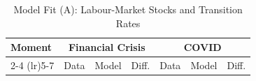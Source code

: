 \begin{table}[htbp]
  \centering
  \caption{Model Fit (A): Labour-Market Stocks and Transition Rates}
  \label{tab:model_fit_a}
  \small
  \begin{tabular}{lrrrrrr}
    \toprule
    Moment & \multicolumn{3}{c}{Financial Crisis} & \multicolumn{3}{c}{COVID} \\
    \cmidrule(lr){2-4} \cmidrule(lr){5-7}
     & Data & Model & Diff. & Data & Model & Diff. \\
    \midrule
    \bottomrule
  \end{tabular}
\end{table}